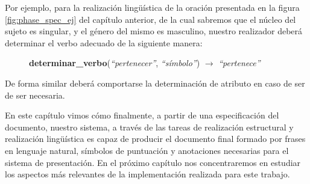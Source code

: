 Por ejemplo, para la realización lingüística de la oración presentada en la figura \ref{fig:phase_spec_ej} del capítulo anterior, de la cual sabremos que el núcleo del sujeto es singular, y el género del mismo es masculino, nuestro realizador deberá determinar el verbo adecuado de la siguiente manera:

\begin{figure}[H]
\centering
\textbf{determinar\_verbo}(\emph{``pertenecer''}, \emph{``símbolo''}) $\rightarrow$ \emph{``pertenece''}
\end{figure}

\noindent
De forma similar deberá comportarse la determinación de atributo en caso de ser de ser necesaria. 

\bigskip
En este capítulo vimos cómo finalmente, a partir de una especificación del documento, nuestro sistema, a través de las tareas de realización estructural y realización lingüística es capaz de producir el documento final formado por frases en lenguaje natural, símbolos de puntuación y anotaciones necesarias para el sistema de presentación. En el próximo capítulo nos concentraremos en estudiar los aspectos más relevantes de la implementación realizada para este trabajo.